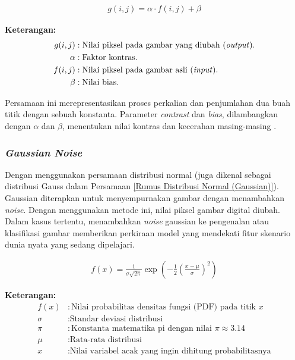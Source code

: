     
    
    \begin{equation}
      \begin{aligned} 
        g(i, j) = \alpha \cdot f(i, j) + \beta
        \end{aligned}\label{Augmentasi Nilai Kontras}
    \end{equation}


    \textbf{Keterangan:}
      \begin{align*}
        g(i, j) & : \text{Nilai piksel pada gambar yang diubah (\textit{output})}. \\
        \alpha & : \text{Faktor kontras}. \\
         f(i, j) & : \text{Nilai piksel pada gambar asli (\textit{input})}.\\
         \beta & : \text{Nilai bias}.\\
    \end{align*}

    Persamaan ini merepresentasikan proses perkalian dan penjumlahan dua buah titik dengan sebuah konstanta. 
    Parameter \textit{contrast} dan \textit{bias}, dilambangkan dengan $\alpha$ dan  $\beta$, menentukan nilai kontras 
    dan kecerahan masing-masing \cite{Szeliski2021}.
    
\subsubsection{\textit{Gaussian Noise}}


     Dengan menggunakan persamaan distribusi normal (juga dikenal sebagai distribusi Gauss dalam Persamaan \ref{Rumus Distribusi Normal (Gaussian)}). Gaussian diterapkan untuk menyempurnakan gambar dengan menambahkan \textit{noise}. Dengan menggunakan metode ini, nilai piksel gambar digital diubah. Dalam kasus tertentu, menambahkan \textit{noise} gaussian ke pengenalan atau klasifikasi gambar memberikan perkiraan model yang mendekati fitur skenario dunia nyata yang sedang dipelajari.
 

    \begin{equation}
        \begin{aligned}
            f(x) = \frac{1}{\sigma \sqrt{2\pi}} \exp\left(-\frac{1}{2} \left(\frac{x - \mu}{\sigma}\right)^2\right)
        \end{aligned}\label{Rumus Distribusi Normal (Gaussian)}
    \end{equation}


    \textbf{Keterangan:}
      \begin{align*}
        f(x) & : \text{Nilai probabilitas densitas fungsi (PDF) pada titik } x \\
        \sigma & : \text{Standar deviasi distribusi} \\
        \pi & : \text{Konstanta matematika pi dengan nilai } \pi \approx 3.14\\
        \mu & : \text{Rata-rata distribusi} \\
        x & : \text{Nilai variabel acak yang ingin dihitung probabilitasnya} \\
    \end{align*}
    


